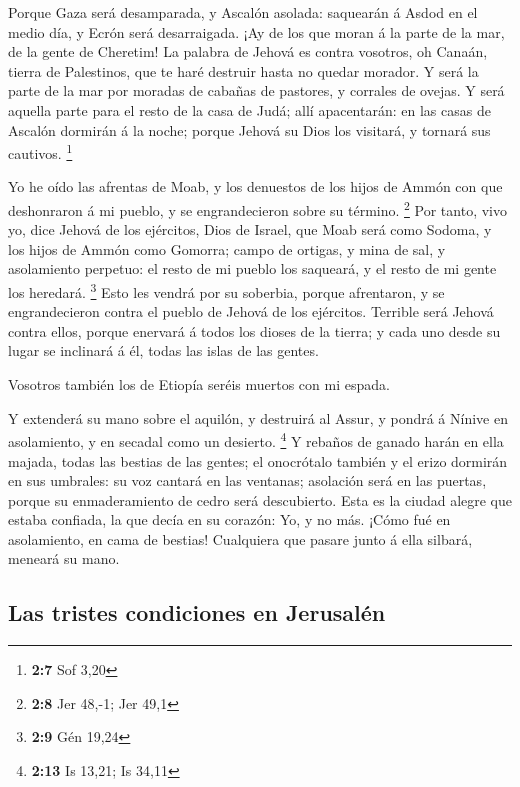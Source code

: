 Porque Gaza será desamparada, y Ascalón asolada:
saquearán á Asdod en el medio día, y Ecrón será desarraigada.
 ¡Ay de los que moran á la parte de la mar, de la gente de
Cheretim! La palabra de Jehová es contra vosotros, oh Canaán, tierra de
Palestinos, que te haré destruir hasta no quedar morador. 
Y será la parte de la mar por moradas de cabañas de pastores, y corrales
de ovejas.  Y será aquella parte para el resto de la casa
de Judá; allí apacentarán: en las casas de Ascalón dormirán á la noche;
porque Jehová su Dios los visitará, y tornará sus cautivos. \footnote{\textbf{2:7}
  Sof 3,20}

 Yo he oído las afrentas de Moab, y los denuestos de los
hijos de Ammón con que deshonraron á mi pueblo, y se engrandecieron
sobre su término. \footnote{\textbf{2:8} Jer 48,-1; Jer 49,1}
 Por tanto, vivo yo, dice Jehová de los ejércitos, Dios de
Israel, que Moab será como Sodoma, y los hijos de Ammón como Gomorra;
campo de ortigas, y mina de sal, y asolamiento perpetuo: el resto de mi
pueblo los saqueará, y el resto de mi gente los heredará. \footnote{\textbf{2:9}
  Gén 19,24}  Esto les vendrá por su soberbia, porque
afrentaron, y se engrandecieron contra el pueblo de Jehová de los
ejércitos.  Terrible será Jehová contra ellos, porque
enervará á todos los dioses de la tierra; y cada uno desde su lugar se
inclinará á él, todas las islas de las gentes.

 Vosotros también los de Etiopía seréis muertos con mi
espada.

 Y extenderá su mano sobre el aquilón, y destruirá al
Assur, y pondrá á Nínive en asolamiento, y en secadal como un desierto.
\footnote{\textbf{2:13} Is 13,21; Is 34,11}  Y rebaños de
ganado harán en ella majada, todas las bestias de las gentes; el
onocrótalo también y el erizo dormirán en sus umbrales: su voz cantará
en las ventanas; asolación será en las puertas, porque su enmaderamiento
de cedro será descubierto.  Esta es la ciudad alegre que
estaba confiada, la que decía en su corazón: Yo, y no más. ¡Cómo fué en
asolamiento, en cama de bestias! Cualquiera que pasare junto á ella
silbará, meneará su mano.

\hypertarget{las-tristes-condiciones-en-jerusaluxe9n}{%
\subsection{Las tristes condiciones en
Jerusalén}\label{las-tristes-condiciones-en-jerusaluxe9n}}

